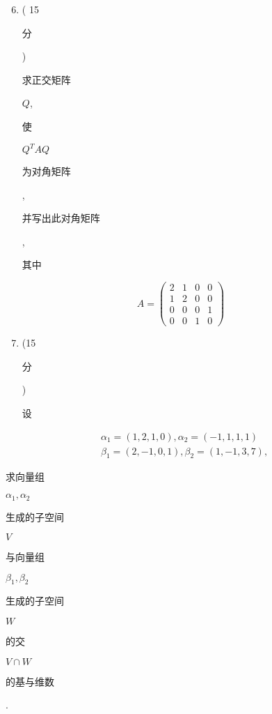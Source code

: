 \documentclass[10pt]{article}
\begin{document}
\begin{enumerate}
  \setcounter{enumi}{5}
  \item ( 15 \begin{CJK}{UTF8}{mj}分\end{CJK}) \begin{CJK}{UTF8}{mj}求正交矩阵\end{CJK} $Q$, \begin{CJK}{UTF8}{mj}使\end{CJK} $Q^{T} A Q$ \begin{CJK}{UTF8}{mj}为对角矩阵\end{CJK}, \begin{CJK}{UTF8}{mj}并写出此对角矩阵\end{CJK}, \begin{CJK}{UTF8}{mj}其中\end{CJK}
\end{enumerate}
$$
A=\left(\begin{array}{llll}
2 & 1 & 0 & 0 \\
1 & 2 & 0 & 0 \\
0 & 0 & 0 & 1 \\
0 & 0 & 1 & 0
\end{array}\right)
$$

\begin{enumerate}
  \setcounter{enumi}{6}
  \item (15 \begin{CJK}{UTF8}{mj}分\end{CJK}) \begin{CJK}{UTF8}{mj}设\end{CJK}
\end{enumerate}
$$
\begin{aligned}
&\alpha_{1}=(1,2,1,0), \alpha_{2}=(-1,1,1,1) \\
&\beta_{1}=(2,-1,0,1), \beta_{2}=(1,-1,3,7),
\end{aligned}
$$
\begin{CJK}{UTF8}{mj}求向量组\end{CJK} $\alpha_{1}, \alpha_{2}$ \begin{CJK}{UTF8}{mj}生成的子空间\end{CJK} $V$ \begin{CJK}{UTF8}{mj}与向量组\end{CJK} $\beta_{1}, \beta_{2}$ \begin{CJK}{UTF8}{mj}生成的子空间\end{CJK} $W$ \begin{CJK}{UTF8}{mj}的交\end{CJK} $V \cap W$ \begin{CJK}{UTF8}{mj}的基与维数\end{CJK}.
\end{document}
